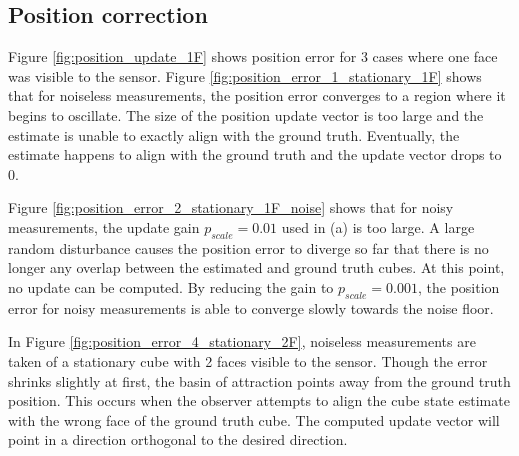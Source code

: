 \subsection{Position correction}
Figure \ref{fig:position_update_1F} shows position error for 3 cases where one face was visible to the sensor. Figure \ref{fig:position_error_1_stationary_1F} shows that for noiseless measurements, the position error converges to a region where it begins to oscillate. The size of the position update vector is too large and the estimate is unable to exactly align with the ground truth. Eventually, the estimate happens to align with the ground truth and the update vector drops to 0.

Figure \ref{fig:position_error_2_stationary_1F_noise} shows that for noisy measurements, the update gain $p_{scale} = 0.01$ used in (a) is too large. A large random disturbance causes the position error to diverge so far that there is no longer any overlap between the estimated and ground truth cubes. At this point, no update can be computed.
By reducing the gain to $p_{scale} = 0.001$, the position error for noisy measurements is able to converge slowly towards the noise floor.

In Figure \ref{fig:position_error_4_stationary_2F}, noiseless measurements are taken of a stationary cube with 2 faces visible to the sensor. Though the error shrinks slightly at first, the basin of attraction points away from the ground truth position. 
This occurs when the observer attempts to align the cube state estimate with the wrong face of the ground truth cube. The computed update vector will point in a direction orthogonal to the desired direction.

